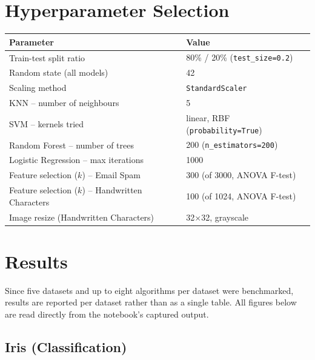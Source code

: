 \documentclass[12pt,a4paper]{article}
\begin{document}
\section{Hyperparameter Selection}
 
\begin{tabular}{ll}
\toprule
Parameter & Value \\
\midrule
Train-test split ratio & 80\% / 20\% (\texttt{test\_size=0.2}) \\
Random state (all models) & 42 \\
Scaling method & \texttt{StandardScaler} \\
KNN -- number of neighbours & 5 \\
SVM -- kernels tried & linear, RBF (\texttt{probability=True}) \\
Random Forest -- number of trees & 200 (\texttt{n\_estimators=200}) \\
Logistic Regression -- max iterations & 1000 \\
Feature selection ($k$) -- Email Spam & 300 (of 3000, ANOVA F-test) \\
Feature selection ($k$) -- Handwritten Characters & 100 (of 1024, ANOVA F-test) \\
Image resize (Handwritten Characters) & 32$\times$32, grayscale \\
\bottomrule
\end{tabular}
 
 
 
\section{Results}
Since five datasets and up to eight algorithms per dataset were benchmarked, results are reported per dataset rather than as a single table. All figures below are read directly from the notebook's captured output.
 
\subsection{Iris (Classification)}
\begingroup\small
{}
\endgroup
 
\end{document}
